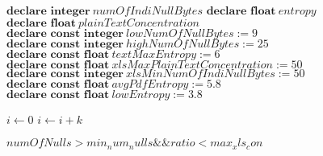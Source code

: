 \documentclass{article}
\begin{document}
\begin{algorithmic}
\State$\textbf{declare integer} \ numOfIndiNullBytes$
\State$\textbf{declare float} \ entropy$
\State$\textbf{declare float} \ plainTextConcentration$\\
\State$\textbf{declare const integer} \ lowNumOfNullBytes:= 9$
\State$\textbf{declare const integer} \ highNumOfNullBytes:= 25$
\State$\textbf{declare const float} \ textMaxEntropy:= 6 $
\State$\textbf{declare const float} \ xlsMaxPlainTextConcentration:= 50$
\State$\textbf{declare const integer} \ xlsMinNumOfIndiNullBytes:= 50$
\State$\textbf{declare const float} \ avgPdfEntropy:= 5.8$
\State$\textbf{declare const float} \ lowEntropy:= 3.8$





    \State $i\gets 0$
\Else
        \State $i\gets i+k$
    \EndIf
\EndIf
~\\
   
    \State \Return $numOfNulls > min_num_nulls \&\& ratio < max_xls_con$
\EndFunction
\end{algorithmic}
\end{document}
